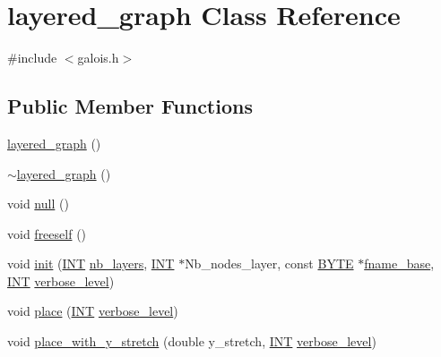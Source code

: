 \hypertarget{classlayered__graph}{}\section{layered\+\_\+graph Class Reference}
\label{classlayered__graph}


{\ttfamily \#include $<$galois.\+h$>$}

\subsection*{Public Member Functions}
\begin{DoxyCompactItemize}
\item 
\mbox{\hyperlink{classlayered__graph_a4376cdc81ba893f988b1b6e96e8f6c97}{layered\+\_\+graph}} ()
\item 
\mbox{\hyperlink{classlayered__graph_a8e078a5d771a1b22faaa4ffa434025b9}{$\sim$layered\+\_\+graph}} ()
\item 
void \mbox{\hyperlink{classlayered__graph_a264acfdb2bbde82d82fc18f33adc9f35}{null}} ()
\item 
void \mbox{\hyperlink{classlayered__graph_a125d492d12cce07cfad75e6cc9e1e2b0}{freeself}} ()
\item 
void \mbox{\hyperlink{classlayered__graph_a3d3422898f1e8d31eb937fcc460dbac2}{init}} (\mbox{\hyperlink{galois_8h_a09fddde158a3a20bd2dcadb609de11dc}{I\+NT}} \mbox{\hyperlink{classlayered__graph_a902d543943821786b2f2bff5d776b0cd}{nb\+\_\+layers}}, \mbox{\hyperlink{galois_8h_a09fddde158a3a20bd2dcadb609de11dc}{I\+NT}} $\ast$Nb\+\_\+nodes\+\_\+layer, const \mbox{\hyperlink{galois_8h_ab6cc7b4aeb6ea31aba2b3fbfc83ff5e6}{B\+Y\+TE}} $\ast$\mbox{\hyperlink{classlayered__graph_a4f2e41c956d3605418eb0f5975917c1c}{fname\+\_\+base}}, \mbox{\hyperlink{galois_8h_a09fddde158a3a20bd2dcadb609de11dc}{I\+NT}} \mbox{\hyperlink{simeon_8_c_a818073fbcc2f439e7c56952f67386122}{verbose\+\_\+level}})
\item 
void \mbox{\hyperlink{classlayered__graph_a5449ff3de184b379ed6986f6e78c8c4a}{place}} (\mbox{\hyperlink{galois_8h_a09fddde158a3a20bd2dcadb609de11dc}{I\+NT}} \mbox{\hyperlink{simeon_8_c_a818073fbcc2f439e7c56952f67386122}{verbose\+\_\+level}})
\item 
void \mbox{\hyperlink{classlayered__graph_a91be2d3f0093247a7fa3bf3aedf1fdfb}{place\+\_\+with\+\_\+y\+\_\+stretch}} (double y\+\_\+stretch, \mbox{\hyperlink{galois_8h_a09fddde158a3a20bd2dcadb609de11dc}{I\+NT}} \mbox{\hyperlink{simeon_8_c_a818073fbcc2f439e7c56952f67386122}{verbose\+\_\+level}})

\end{DoxyCompactItemize}
